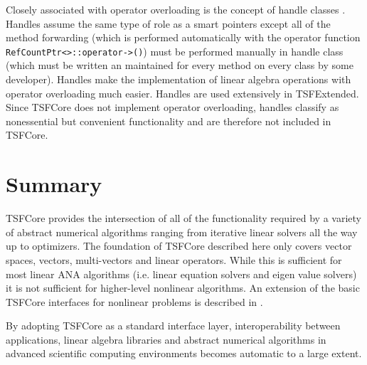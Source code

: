 Closely associated with operator overloading is the concept of handle
classes {}\cite{ref:advanced_c++_coplien}.  Handles assume the same
type of role as a smart pointers except all of the method forwarding
(which is performed automatically with the operator function
{}\texttt{RefCountPtr<>\-::operator->()}) must be performed manually
in handle class (which must be written an maintained for every method
on every class by some developer).  Handles make the implementation of
linear algebra operations with operator overloading much easier.
Handles are used extensively in TSFExtended.  Since TSFCore does not
implement operator overloading, handles classify as nonessential but
convenient functionality and are therefore not included in TSFCore.

%
\section{Summary}
%

TSFCore provides the intersection of all of the functionality required
by a variety of abstract numerical algorithms ranging from iterative
linear solvers all the way up to optimizers.  The foundation of
TSFCore described here only covers vector spaces, vectors,
multi-vectors and linear operators.  While this is sufficient for most
linear ANA algorithms (i.e. linear equation solvers and eigen value
solvers) it is not sufficient for higher-level nonlinear algorithms.
An extension of the basic TSFCore interfaces for nonlinear problems is
described in {}\cite{ref:TSFCore::Nonlin}.

By adopting TSFCore as a standard interface layer, interoperability
between applications, linear algebra libraries and abstract numerical
algorithms in advanced scientific computing environments becomes
automatic to a large extent.
